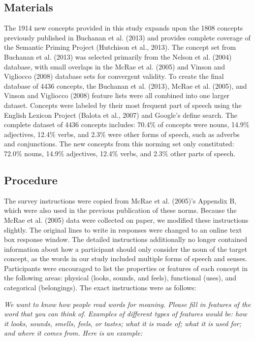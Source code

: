 \documentclass[english,,man]{apa6}
\begin{document}
\hypertarget{materials}{%
\subsection{Materials}\label{materials}}

The 1914 new concepts provided in this study expands upon the 1808 concepts previously published in Buchanan et al. (2013) and provides complete coverage of the Semantic Priming Project (Hutchison et al., 2013). The concept set from Buchanan et al. (2013) was selected primarily from the Nelson et al. (2004) database, with small overlaps in the McRae et al. (2005) and Vinson and Vigliocco (2008) database sets for convergent validity. To create the final database of 4436 concepts, the Buchanan et al. (2013), McRae et al. (2005), and Vinson and Vigliocco (2008) feature lists were all combined into one larger dataset. Concepts were labeled by their most frequent part of speech using the English Lexicon Project (Balota et al., 2007) and Google's define search. The complete dataset of 4436 concepts includes: 70.4\% of concepts were nouns, 14.9\% adjectives, 12.4\% verbs, and 2.3\% were other forms of speech, such as adverbs and conjunctions. The new concepts from this norming set only constituted: 72.0\% nouns, 14.9\% adjectives, 12.4\% verbs, and 2.3\% other parts of speech.

\hypertarget{procedure}{%
\subsection{Procedure}\label{procedure}}

The survey instructions were copied from McRae et al. (2005)'s Appendix B, which were also used in the previous publication of these norms. Because the McRae et al. (2005) data were collected on paper, we modified these instructions slightly. The original lines to write in responses were changed to an online text box response window. The detailed instructions additionally no longer contained information about how a participant should only consider the noun of the target concept, as the words in our study included multiple forms of speech and senses. Participants were encouraged to list the properties or features of each concept in the following areas: physical (looks, sounds, and feels), functional (uses), and categorical (belongings). The exact instructions were as follows:

\emph{We want to know how people read words for meaning. Please fill in features of the word that you can think of. Examples of different types of features would be: how it looks, sounds, smells, feels, or tastes; what it is made of; what it is used for; and where it comes from. Here is an example:}
\end{document}
